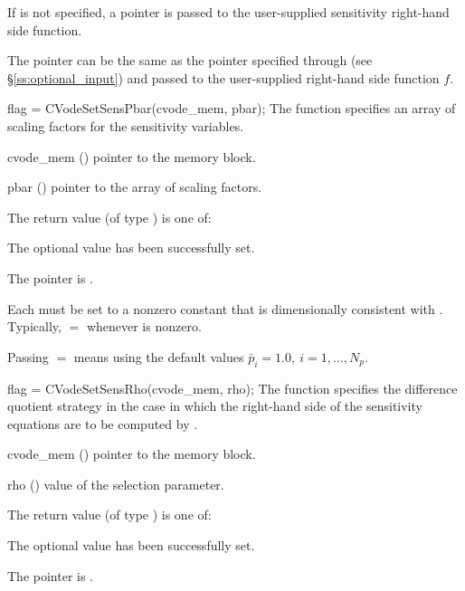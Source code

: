 {
  If  is not specified, a  pointer is
  passed to the user-supplied sensitivity right-hand side function.

  The pointer  can be the same as the pointer 
  specified through  (see \S\ref{ss:optional_input})
  and passed to the user-supplied right-hand side function $f$.
}
{
  flag = CVodeSetSensPbar(cvode\_mem, pbar);
}
{
  The function  specifies an array of scaling factors for 
  the sensitivity variables.
}
{
  \begin{args}
  \item[cvode\_mem] ()
    pointer to the {\cvodes} memory block.
  \item[pbar] ()
    pointer to the array of scaling factors.
  \end{args}
}
{
  The return value  (of type ) is one of:
  \begin{args}
  \item[\Id{CV\_SUCCESS}] 
    The optional value has been successfully set.
  \item[\Id{CV\_MEM\_NULL}]
    The  pointer is .
  \end{args}
}
{
  Each  must be set to a nonzero constant that is
  dimensionally consistent with .
  Typically, $=$ whenever  is nonzero.

  Passing $=$ means using the default values
  ${\bar p}_i = 1.0, ~ i = 1,\ldots,N_p$.
}
{
  flag = CVodeSetSensRho(cvode\_mem, rho);
}
{
  The function  specifies the difference quotient strategy in
  the case in which the right-hand side of the sensitivity equations are to
  be computed by {\cvodes}.
}
{
  \begin{args}
  \item[cvode\_mem] ()
    pointer to the {\cvodes} memory block.
  \item[rho] ()
    value of the selection parameter.
  \end{args}
}
{
  The return value  (of type ) is one of:
  \begin{args}
  \item[\Id{CV\_SUCCESS}]
    The optional value has been successfully set.
  \item[\Id{CV\_MEM\_NULL}]
    The  pointer is .
  \end{args}
}
